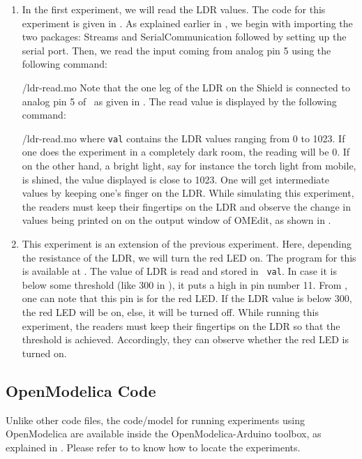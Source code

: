 \begin{enumerate}
  \item In the first experiment, we will read the LDR values. The code for this experiment is given in
         . As explained earlier in , 
        we begin with importing the two packages: Streams and SerialCommunication followed 
        by setting up the serial port. Then, we read the input coming from analog pin 5 using the 
        following command:
        
        {\LocLDROpenModelicacode/ldr-read.mo} Note that the one leg of the LDR on
        the Shield is connected to analog pin 5 of \arduino\, 
        as given in . The read value is displayed 
        by the following command: 
        
        {\LocLDROpenModelicacode/ldr-read.mo} where {\tt val} contains
        the LDR values ranging from 0 to 1023. If one does the experiment in a completely dark room, the
        reading will be 0. If on the other hand, a bright light, say for instance the torch
        light from mobile, is shined, the value displayed is close to 1023. One will get
        intermediate values by keeping one's finger on the LDR. While simulating this experiment, the readers must keep their fingertips on the LDR and
        observe the change in values being printed on on the output window of OMEdit, as shown in .
        
  \item This experiment is an extension of the previous experiment. Here, depending the resistance of the LDR, we will
        turn the red LED on.  The program for this is available at
        .  The value of LDR is read and stored in {\tt
            val}.  In case it is below some threshold (like 300 in ), 
        it puts a high in pin number 11. From , 
        one can note that this pin is for the red LED. If the LDR value is below 300, 
        the red LED will be on, else, it will be turned off. While running this experiment, the readers 
        must keep their fingertips on the LDR so that the threshold is achieved. Accordingly, 
        they can observe whether the red LED is turned on. 
\end{enumerate}

\subsection{OpenModelica Code}
Unlike other code files, the code/model for running experiments using OpenModelica are 
available inside the OpenModelica-Arduino toolbox, as explained in .
Please refer to  to know how to locate the experiments. 

